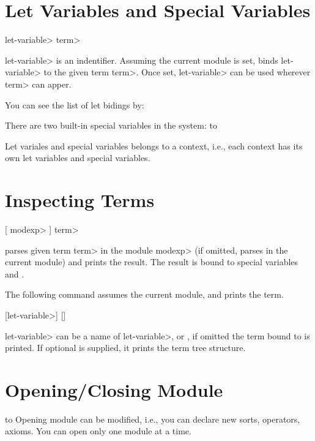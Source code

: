 \documentclass[a4paper,oneside,twocolumn]{memoir}
\begin{document}
\section{Let Variables and Special Variables}

 \<let-variable> \kbd{=} \<term> 

\<let-variable> is an indentifier. Assuming the current module is set, 
 binds \<let-variable> to the given term \<term>.
Once set, \<let-variable> can be used wherever \<term> can apper.

You can see the list of let bidings by:


There are two built-in special variables in the system:
\paralign to 

Let variales and special variables belongs to a context, i.e., each
context has its own let variables and special variables.

\section{Inspecting Terms}
 [ \<modexp> \kbd{:}] \<term> 

 parses given term \<term> in the module \<modexp> (if
omitted, parses in the current module) and prints the result.
The result is bound to special variables  and
. 

The following  command assumes the current module, and
prints the term.

 [\<let-variable>] []

\<let-variable> can be a name of \<let-variable>,  or
, if omitted the term bound to  is
printed.  If optional  is supplied, it prints the term tree 
structure. 

\section{Opening/Closing Module}

\paralign to 
Opening module can be modified, i.e., you can declare new sorts,
operators, axioms. You can open only one module at a time.
\end{document}
